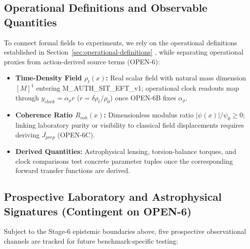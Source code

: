 \documentclass[american,11pt,letterpaper]{article}
\def\mathrm#1{#1}%
\def\texttt#1{#1}%
\begin{document}
\subsection{Operational Definitions and Observable Quantities}

To connect formal fields to experiments, we rely on the operational definitions established in Section~\ref{sec:operational-definitions} \label{sec:def}, while separating operational proxies from action-derived source terms (\texttt{OPEN-6}):

\begin{itemize}
    \item \textbf{Time-Density Field $\rho_t(x)$:} Real scalar field with natural mass dimension $[M]^1$ entering \texttt{M\_AUTH\_SIT\_EFT\_v1}; operational clock readouts map through $y_{\mathrm{clock}} = \alpha_\rho r$ ($r = \delta\rho_t/\rho_0$) once \texttt{OPEN-6B} fixes $\alpha_\rho$.
    \item \textbf{Coherence Ratio $R_{\mathrm{coh}}(x)$:} Dimensionless modulus ratio $|\psi(x)|/\psi_0 \ge 0$; linking laboratory purity or visibility to classical field displacements requires deriving $J_{\mathrm{prep}}$ (\texttt{OPEN-6C}).
    \item \textbf{Derived Quantities:} Astrophysical lensing, torsion-balance torques, and clock comparisons test concrete parameter tuples once the corresponding forward transfer functions are derived.
\end{itemize}

\subsection{Prospective Laboratory and Astrophysical Signatures (Contingent on \texttt{OPEN-6})}

Subject to the Stage-6 epistemic boundaries above, five prospective observational channels are tracked for future benchmark-specific testing:
\end{document}
